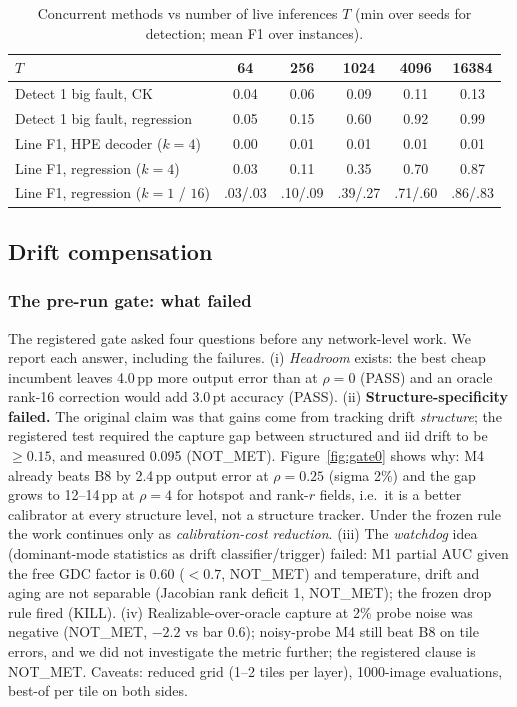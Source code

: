 \documentclass[journal]{IEEEtran}
\newcommand{\mfour}{\textsc{M4}}
\newcommand{\bviii}{\textsc{B8}}
\newcommand{\pt}{\,pt}
\begin{document}
\begin{table}[t]
\caption{Concurrent methods vs number of live inferences $T$ (min over seeds for detection; mean F1 over instances).}
\label{tab:h7}
\centering\scriptsize\setlength{\tabcolsep}{2.5pt}
\begin{tabular}{lccccc}
\toprule
$T$ & 64 & 256 & 1024 & 4096 & 16384 \\
\midrule
Detect 1 big fault, CK & 0.04 & 0.06 & 0.09 & 0.11 & 0.13 \\
Detect 1 big fault, regression & 0.05 & 0.15 & 0.60 & 0.92 & 0.99 \\
Line F1, HPE decoder ($k{=}4$) & 0.00 & 0.01 & 0.01 & 0.01 & 0.01 \\
Line F1, regression ($k{=}4$) & 0.03 & 0.11 & 0.35 & 0.70 & 0.87 \\
Line F1, regression ($k{=}1$ / $16$) & .03/.03 & .10/.09 & .39/.27 & .71/.60 & .86/.83 \\
\bottomrule
\end{tabular}
\end{table}


\subsection{Drift compensation}
\label{sec:results-a}
\subsubsection{The pre-run gate: what failed}
The registered gate asked four questions before any network-level work. We report each answer, including the failures.
(i) \emph{Headroom} exists: the best cheap incumbent leaves 4.0\,pp more output error than at $\rho=0$ (PASS) and an oracle rank-16 correction would add 3.0\pt{} accuracy (PASS).
(ii) \textbf{Structure-specificity failed.} The original claim was that gains come from tracking drift \emph{structure}; the registered test required the capture gap between structured and iid drift to be $\ge0.15$, and measured 0.095 (NOT\_MET).
Figure~\ref{fig:gate0} shows why: \mfour{} already beats \bviii{} by 2.4\,pp output error at $\rho=0.25$ (sigma 2\%) and the gap grows to 12--14\,pp at $\rho=4$ for hotspot and rank-$r$ fields,
i.e.\ it is a better calibrator at every structure level, not a structure tracker. Under the frozen rule the work continues only as \emph{calibration-cost reduction}.
(iii) The \emph{watchdog} idea (dominant-mode statistics as drift classifier/trigger) failed: M1 partial AUC given the free GDC factor is 0.60 ($<0.7$, NOT\_MET) and temperature, drift and aging are not separable (Jacobian rank deficit 1, NOT\_MET); the frozen drop rule fired (KILL).
(iv) Realizable-over-oracle capture at 2\% probe noise was negative (NOT\_MET, $-2.2$ vs bar $0.6$); noisy-probe \mfour{} still beat \bviii{} on tile errors, and we did not investigate the metric further; the registered clause is NOT\_MET.
Caveats: reduced grid (1--2 tiles per layer), 1000-image evaluations, best-of per tile on both sides.
\end{document}
